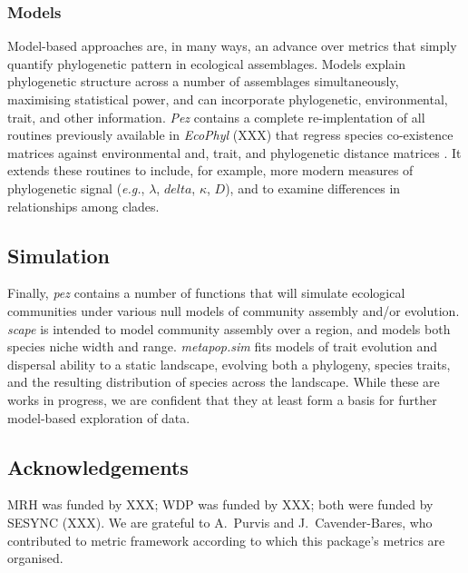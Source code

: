 \documentclass[11pt]{article} %
\begin{document}
\subsubsection*{Models}
Model-based approaches are, in many ways, an advance over metrics that
simply quantify phylogenetic pattern in ecological assemblages. Models
explain phylogenetic structure across a number of assemblages
simultaneously, maximising statistical power, and can incorporate
phylogenetic, environmental, trait, and other information. \emph{Pez}
contains a complete re-implentation of all routines previously
available in \emph{EcoPhyl} (XXX) that regress species co-existence
matrices against environmental and, trait, and phylogenetic distance
matrices \autocite{Cavender-Bares2004,Cavender-Bares2006}. It extends
these routines to include, for example, more modern measures of
phylogenetic signal (\emph{e.g.}, $\lambda$, $delta$, $\kappa$, $D$),
and to examine differences in relationships among clades.
\subsection*{Simulation}
Finally, \emph{pez} contains a number of functions that will simulate
ecological communities under various null models of community assembly
and/or evolution. \emph{scape} is intended to model community assembly
over a region, and models both species niche width and
range. \emph{metapop.sim} fits models of trait evolution and dispersal
ability to a static landscape, evolving both a phylogeny, species
traits, and the resulting distribution of species across the
landscape. While these are works in progress, we are confident that
they at least form a basis for further model-based exploration of
data.
\subsection*{Acknowledgements}
MRH was funded by XXX; WDP was funded by XXX; both were funded by
SESYNC (XXX). We are grateful to A.\ Purvis and J.\ Cavender-Bares,
who contributed to metric framework according to which this package's
metrics are organised.

\printbibliography
\end{document}
